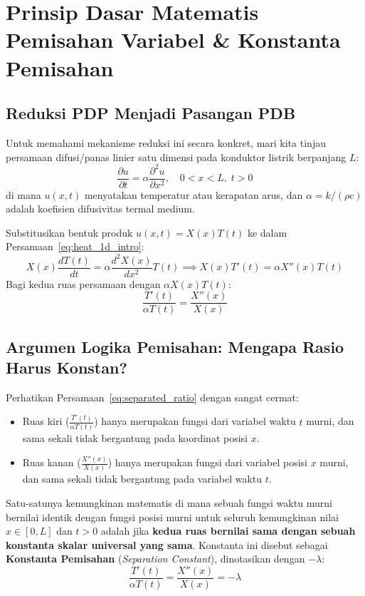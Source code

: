 \documentclass[11pt,a4paper]{article}
\theoremstyle{definition}
\begin{document}
\section{Prinsip Dasar Matematis Pemisahan Variabel \& Konstanta Pemisahan}

\subsection{Reduksi PDP Menjadi Pasangan PDB}
Untuk memahami mekanisme reduksi ini secara konkret, mari kita tinjau persamaan difusi/panas linier satu dimensi pada konduktor listrik berpanjang $L$:
\begin{equation}
    \frac{\partial u}{\partial t} = \alpha \frac{\partial^2 u}{\partial x^2}, \quad 0 < x < L, \; t > 0
    \label{eq:heat_1d_intro}
\end{equation}
di mana $u(x, t)$ menyatakan temperatur atau kerapatan arus, dan $\alpha = k/(\rho c)$ adalah koefisien difusivitas termal medium.

Substitusikan bentuk produk $u(x, t) = X(x) T(t)$ ke dalam Persamaan~\eqref{eq:heat_1d_intro}:
\begin{equation}
    X(x) \frac{dT(t)}{dt} = \alpha \frac{d^2X(x)}{dx^2} T(t) \implies X(x) T'(t) = \alpha X''(x) T(t)
\end{equation}
Bagi kedua ruas persamaan dengan $\alpha X(x) T(t)$:
\begin{equation}
    \frac{T'(t)}{\alpha T(t)} = \frac{X''(x)}{X(x)}
    \label{eq:separated_ratio}
\end{equation}

\subsection{Argumen Logika Pemisahan: Mengapa Rasio Harus Konstan?}
Perhatikan Persamaan~\eqref{eq:separated_ratio} dengan sangat cermat:
\begin{itemize}[leftmargin=*]
    \item Ruas kiri ($\frac{T'(t)}{\alpha T(t)}$) hanya merupakan fungsi dari variabel waktu $t$ murni, dan sama sekali tidak bergantung pada koordinat posisi $x$.
    \item Ruas kanan ($\frac{X''(x)}{X(x)}$) hanya merupakan fungsi dari variabel posisi $x$ murni, dan sama sekali tidak bergantung pada variabel waktu $t$.
\end{itemize}
Satu-satunya kemungkinan matematis di mana sebuah fungsi waktu murni bernilai identik dengan fungsi posisi murni untuk seluruh kemungkinan nilai $x \in [0, L]$ dan $t > 0$ adalah jika \textbf{kedua ruas bernilai sama dengan sebuah konstanta skalar universal yang sama}. Konstanta ini disebut sebagai \textbf{Konstanta Pemisahan} (\textit{Separation Constant}), dinotasikan dengan $-\lambda$:
\begin{equation}
    \frac{T'(t)}{\alpha T(t)} = \frac{X''(x)}{X(x)} = -\lambda
    \label{eq:separation_constant}
\end{equation}
\end{document}
